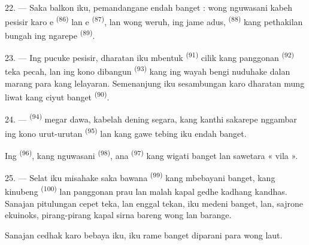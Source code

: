 22. --- Saka balkon iku, pemandangane endah banget : wong nguwasani
kabeh pesisir karo e \textsuperscript{(86)} lan
e \textsuperscript{(87)}, lan wong weruh, ing jame
adus,  \textsuperscript{(88)} kang
pethakilan bungah ing ngarepe  \textsuperscript{(89)}.

23. --- Ing pucuke pesisir, dharatan iku mbentuk 
\textsuperscript{(91)} cilik kang  panggonan
 \textsuperscript{(92)} teka pecah, lan ing kono
dibangun  \textsuperscript{(93)} kang ing wayah bengi
nuduhake dalan marang para kang lelayaran. Semenanjung iku sesambungan
karo dharatan mung liwat  kang ciyut banget
\textsuperscript{(90)}.

\VUsaut{3.0mm}
\VUsaut{3.0mm}

24. ---  \textsuperscript{(94)} megar dawa, kabelah
dening segara, kang kanthi sakarepe nggambar ing kono urut-urutan
 \textsuperscript{(95)} lan  kang gawe
tebing iku endah banget.

Ing  \textsuperscript{(96)}, kang nguwasani
 \textsuperscript{(98)}, ana 
\textsuperscript{(97)} kang wigati banget lan sawetara « vila ».

25. --- Selat iku misahake saka bawana 
\textsuperscript{(99)} kang mbebayani banget, kang kinubeng
 \textsuperscript{(100)} lan 
panggonan prau lan malah kapal gedhe kadhang kandhas. Sanajan
pitulungan cepet teka, lan  enggal tekan,
 iku medeni banget, lan, sajrone 
ekuinoks, pirang-pirang kapal sirna bareng wong lan barange.

Sanajan cedhak karo bebaya iku,  iku rame banget
diparani para wong laut.

\VUsaut{6.0mm}
\VUfilet{22mm}

